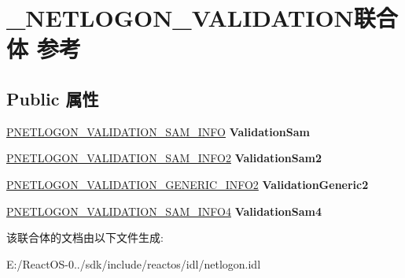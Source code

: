 \hypertarget{union___n_e_t_l_o_g_o_n___v_a_l_i_d_a_t_i_o_n}{}\section{\+\_\+\+N\+E\+T\+L\+O\+G\+O\+N\+\_\+\+V\+A\+L\+I\+D\+A\+T\+I\+O\+N联合体 参考}
\label{union___n_e_t_l_o_g_o_n___v_a_l_i_d_a_t_i_o_n}
\subsection*{Public 属性}
\begin{DoxyCompactItemize}
\item 
\mbox{\label{union___n_e_t_l_o_g_o_n___v_a_l_i_d_a_t_i_o_n_a7609728954e7471e5234072ab1c73fac}} 
\hyperlink{struct___n_e_t_l_o_g_o_n___v_a_l_i_d_a_t_i_o_n___s_a_m___i_n_f_o}{P\+N\+E\+T\+L\+O\+G\+O\+N\+\_\+\+V\+A\+L\+I\+D\+A\+T\+I\+O\+N\+\_\+\+S\+A\+M\+\_\+\+I\+N\+FO} {\bfseries Validation\+Sam}
\item 
\mbox{\label{union___n_e_t_l_o_g_o_n___v_a_l_i_d_a_t_i_o_n_a5e8cb8f2eee8b64ea057f83ae4fb46df}} 
\hyperlink{struct___n_e_t_l_o_g_o_n___v_a_l_i_d_a_t_i_o_n___s_a_m___i_n_f_o2}{P\+N\+E\+T\+L\+O\+G\+O\+N\+\_\+\+V\+A\+L\+I\+D\+A\+T\+I\+O\+N\+\_\+\+S\+A\+M\+\_\+\+I\+N\+F\+O2} {\bfseries Validation\+Sam2}
\item 
\mbox{\label{union___n_e_t_l_o_g_o_n___v_a_l_i_d_a_t_i_o_n_a49a65319013eb620f29a521d93a4cfb2}} 
\hyperlink{struct___n_e_t_l_o_g_o_n___v_a_l_i_d_a_t_i_o_n___g_e_n_e_r_i_c___i_n_f_o2}{P\+N\+E\+T\+L\+O\+G\+O\+N\+\_\+\+V\+A\+L\+I\+D\+A\+T\+I\+O\+N\+\_\+\+G\+E\+N\+E\+R\+I\+C\+\_\+\+I\+N\+F\+O2} {\bfseries Validation\+Generic2}
\item 
\mbox{\label{union___n_e_t_l_o_g_o_n___v_a_l_i_d_a_t_i_o_n_a4f2db071bb6921dacf6e8fb6dc1b7739}} 
\hyperlink{struct___n_e_t_l_o_g_o_n___v_a_l_i_d_a_t_i_o_n___s_a_m___i_n_f_o4}{P\+N\+E\+T\+L\+O\+G\+O\+N\+\_\+\+V\+A\+L\+I\+D\+A\+T\+I\+O\+N\+\_\+\+S\+A\+M\+\_\+\+I\+N\+F\+O4} {\bfseries Validation\+Sam4}
\end{DoxyCompactItemize}


该联合体的文档由以下文件生成\+:\begin{DoxyCompactItemize}
\item 
E\+:/\+React\+O\+S-\/0../sdk/include/reactos/idl/netlogon.\+idl\end{DoxyCompactItemize}
